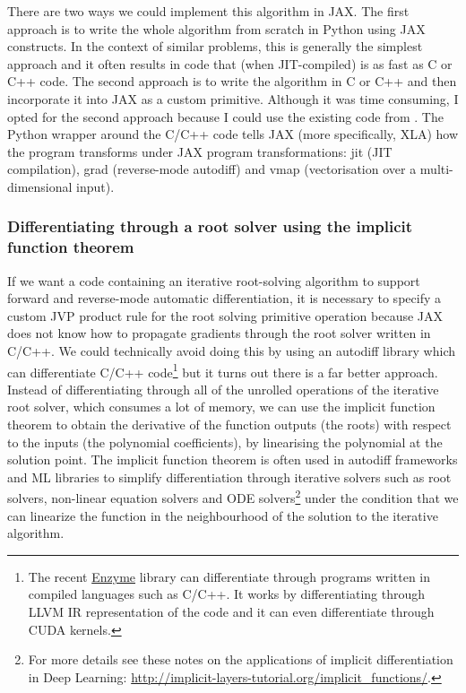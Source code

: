 \documentclass[12pt,dvipsnames]{report}
\newcommand{\ssf}[1]{\textsf{#1}}
\begin{document}
There are two ways we could implement this algorithm in \ssf{JAX}. The first
approach is to write the whole algorithm from scratch in \ssf{Python} using \ssf{JAX} 
constructs. In the context of similar problems, this is generally the simplest approach and it often results in code that 
(when JIT-compiled) is as fast as \ssf{C} or \ssf{C++} code. The second approach is to 
write the algorithm in \ssf{C} or \ssf{C++} and then incorporate it into \ssf{JAX} as a 
custom primitive. Although it was time consuming, I opted for the second approach because 
I could use the existing code from \citet{cameron2021}. The Python wrapper around the 
\ssf{C/C++} code tells \ssf{JAX} (more specifically, \ssf{XLA}) how the program transforms 
under \ssf{JAX} program transformations: \ssf{jit} (JIT compilation),
\ssf{grad} (reverse-mode autodiff) and \ssf{vmap} (vectorisation over a multi-dimensional 
input). 

\subsubsection{Differentiating through a root solver using the implicit function theorem}
If we want a code containing
an iterative root-solving algorithm to support forward and reverse-mode automatic differentiation,
it is necessary to specify a custom JVP product rule 
for the root solving primitive operation  because 
\ssf{JAX} does not know how to propagate gradients through the root solver written in 
\ssf{C/C++}.  We could technically avoid doing this by using an autodiff library which can
differentiate \ssf{C/C++} code\footnote{The recent
    \href{https://enzyme.mit.edu/}{Enzyme} library can differentiate through
    programs written in compiled languages such as \ssf{C/C++}. It works by
    differentiating through LLVM IR representation of the code and it can even differentiate 
    through \ssf{CUDA} kernels.} but it turns out there is a far better approach. 
    Instead of differentiating through all of the unrolled operations of the iterative 
root solver, which consumes a lot of memory, we can use the \ssf{implicit function 
theorem} to obtain the derivative of the function outputs (the roots) with respect to the 
inputs (the polynomial coefficients), by linearising the polynomial at the solution point.
The implicit function theorem is often used in autodiff frameworks and ML libraries  to simplify 
differentiation through iterative solvers such as root solvers, non-linear equation solvers
and ODE solvers\footnote{
    For more details see these notes on the applications of implicit differentiation in Deep 
    Learning: \url{http://implicit-layers-tutorial.org/implicit_functions/}.
} under the condition that we can linearize the function in the neighbourhood of the solution
to the iterative algorithm.
\end{document}
